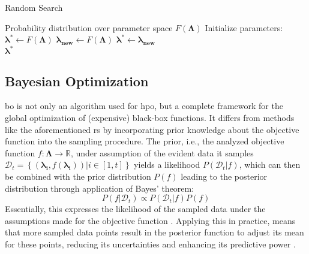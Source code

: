 \begin{algorithm}
	\caption{Random Search}
	\label{alg:randomsearch}
	\begin{algorithmic}
		\Require Probability distribution over parameter space $F(\mathbf{\Lambda})$
		\State Initialize parameters: $\mathbf{\lambda^*} \gets F(\mathbf{\Lambda})$
		\Repeat
		\State $\mathbf{\lambda_{\text{new}}} \gets F(\mathbf{\Lambda})$
		\State $\mathbf{\lambda^*} \gets \mathbf{\lambda_{\text{new}}}$
		\EndIf
		\\
		\Return $\mathbf{\lambda^*}$
	\end{algorithmic}
\end{algorithm}


\subsection{Bayesian Optimization}
\gls{bo} is not only an algorithm used for \gls{hpo}, but a complete framework for the global optimization of (expensive) black-box functions. It differs from methods like the aforementioned \gls{rs} by incorporating prior knowledge about the objective function into the sampling procedure. 
The prior, i.e., the analyzed objective function $f: \mathcal{\mathbf{\Lambda}} \to \mathbb{R}$, under assumption of the evident data it samples $\mathcal{D}_t = \left\lbrace (\mathbf{\lambda_i}, f(\mathbf{\lambda_i})) |  i\in [1,t] \right\rbrace $ yields a likelihood $P(\mathcal{D}_t|f)$, which can then be combined with the prior distribution $P(f)$ leading to the posterior distribution through application of Bayes' theorem:
\begin{equation}
	P(f|\mathcal{D}_t) \propto P(\mathcal{D}_t|f) P(f)
\end{equation}
Essentially, this expresses the likelihood of the sampled data under the assumptions made for the objective function \cite{brochu2010tutorial}. 
Applying this in practice, means that more sampled data points result in the posterior function to adjust its mean for these points, reducing its uncertainties and enhancing its predictive power \cite{williams2006gaussian}. 

